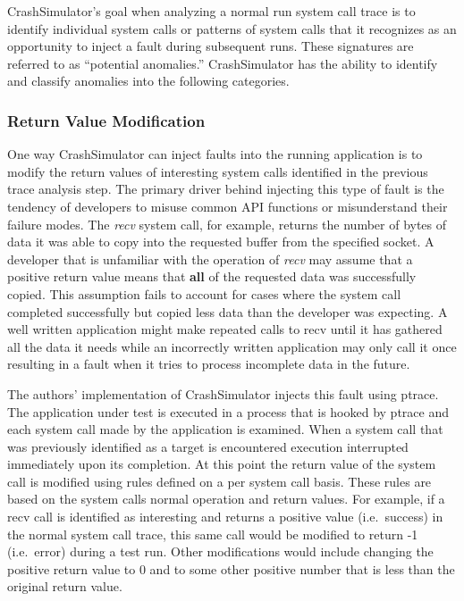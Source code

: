         CrashSimulator's goal when analyzing a normal run system call trace is to identify individual system calls or
        patterns of system calls that it recognizes as an opportunity to inject a fault during subsequent runs. These
        signatures are referred to as ``potential anomalies.'' CrashSimulator has the ability to identify and classify
        anomalies into the following categories.

        \subsubsection{Return Value Modification}

            One way CrashSimulator can inject faults into the running application is to modify the return values of
            interesting system calls identified in the previous trace analysis step. The primary driver behind injecting
            this type of fault is the tendency of developers to misuse common API functions or misunderstand their
            failure modes. The \emph{recv} system call, for example, returns the number of bytes of data it was able to
            copy into the requested buffer from the specified socket. A developer that is unfamiliar with the operation
            of \emph{recv} may assume that a positive return value means that \textbf{all} of the requested data was
            successfully copied. This assumption fails to account for cases where the system call completed successfully
            but copied less data than the developer was expecting. A well written application might make repeated calls
            to recv until it has gathered all the data it needs while an incorrectly written application may only call
            it once resulting in a fault when it tries to process incomplete data in the future.

            The authors' implementation of CrashSimulator injects this fault using ptrace. The application under test is
            executed in a process that is hooked by ptrace and each system call made by the application is examined.
            When a system call that was previously identified as a target is encountered execution interrupted
            immediately upon its completion. At this point the return value of the system call is modified using rules
            defined on a per system call basis. These rules are based on the system calls normal operation and return
            values. For example, if a recv call is identified as interesting and returns a positive value (i.e.\ success)
            in the normal system call trace, this same call would be modified to return -1 (i.e.\ error) during a test
            run. Other modifications would include changing the positive return value to 0 and to some other positive
            number that is less than the original return value.


